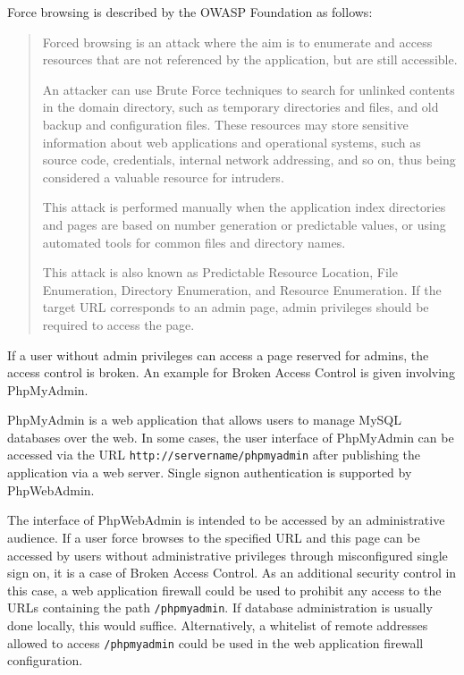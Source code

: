 Force browsing is described by the OWASP Foundation as follows:
\begin{quote}
	Forced browsing is an attack where the aim is to enumerate and access resources that are not referenced by the application, but are still accessible.

	An attacker can use Brute Force techniques to search for unlinked contents in the domain directory, such as temporary directories and files, and old backup and configuration files. These resources may store sensitive information about web applications and operational systems, such as source code, credentials, internal network addressing, and so on, thus being considered a valuable resource for intruders.

	This attack is performed manually when the application index directories and pages are based on number generation or predictable values, or using automated tools for common files and directory names.

	This attack is also known as Predictable Resource Location, File Enumeration, Directory Enumeration, and Resource Enumeration.
	If the target URL corresponds to an admin page, admin privileges should be required to access the page. \cite{OWASP/forcebrowsing}
\end{quote}
If a user without admin privileges can access a page reserved for admins, the access control is broken. An example for Broken Access Control is given involving PhpMyAdmin.

PhpMyAdmin is a web application that allows users to manage MySQL databases over the web.
In some cases, the user interface of PhpMyAdmin can be accessed via the URL \verb|http://servername/phpmyadmin| after publishing the application via a web server. Single signon authentication is supported by PhpWebAdmin.
\cite{phpmyadmin/overview,phpmyadmin/quickinstall,ubuntu/phpmyadmin,phpmyadmin/signon}

The interface of PhpWebAdmin is intended to be accessed by an administrative audience.
If a user force browses to the specified URL and this page can be accessed by users without administrative privileges through misconfigured single sign on, it is a case of Broken Access Control.
As an additional security control in this case, a web application firewall could be used to prohibit any access to the URLs containing the path \verb|/phpmyadmin|.
If database administration is usually done locally, this would suffice.
Alternatively, a whitelist of remote addresses allowed to access \verb|/phpmyadmin| could be used in the web application firewall configuration.

